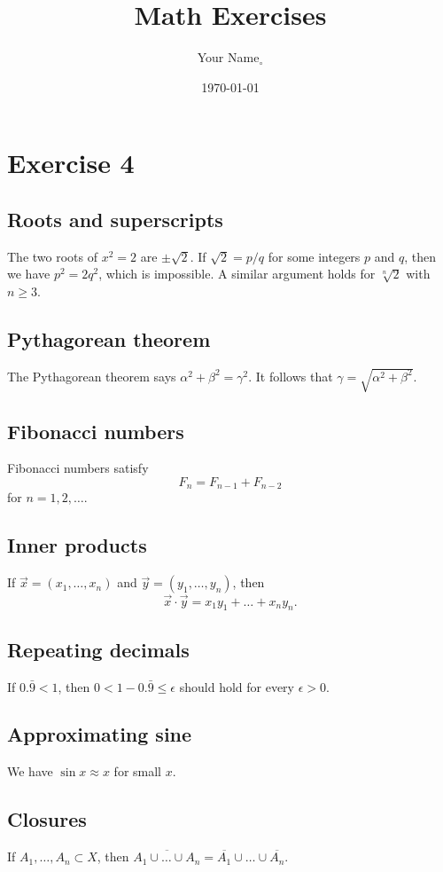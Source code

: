 \documentclass{amsart}
\numberwithin{equation}{section}
\begin{document}
\title{Math Exercises}
\author{Your Name$_\circ$}
\date{\today}

\maketitle

\section{Exercise 4}

\subsection{Roots and superscripts}
The two roots of $x^2 = 2$ are $\pm \sqrt{2}$.
If $\sqrt{2} = p/q$ for some integers $p$ and $q$, then
we have $p^2 = 2q^2$, which is impossible.
A similar argument holds for $\sqrt[n]{2}$ with $n \ge 3$.

\subsection{Pythagorean theorem}
The Pythagorean theorem says $\alpha^2 + \beta^2 = \gamma^2$.
It follows that $\gamma = \sqrt{\alpha^2 + \beta^2}$.

\subsection{Fibonacci numbers}
Fibonacci numbers satisfy
\[ F_n = F_{n-1} + F_{n-2} \]
for $n=1,2,\dots$.

\subsection{Inner products}
If $\vec{x} = (x_1,\dots,x_n)$ and $\vec{y} = (y_1,\ldots,y_n)$,
then
\[ \vec{x}\cdot\vec{y} = x_1y_1 + \dots + x_ny_n. \]

\subsection{Repeating decimals}
If $0.\bar{9} < 1$, then $0 < 1-0.\bar{9}\le\epsilon$ should hold for
every $\epsilon>0$.

\subsection{Approximating sine}
We have $\sin x \approx x$ for small $x$.

\subsection{Closures}
If $A_1,\dots,A_n \subset X$, then $\overline{A_1\cup\dots\cup A_n}
= \overline{A_1}\cup\dots\cup\overline{A_n}$.
\end{document}
